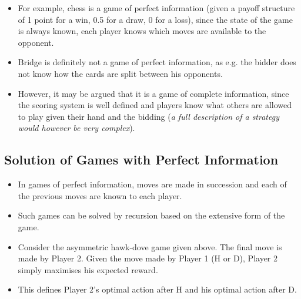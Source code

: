 \documentclass[]{report}
\begin{document}
\begin{itemize}
	\item For example, chess is a game of perfect information (given a payoff
	structure of 1 point for a win, 0.5 for a draw, 0 for a loss), since
	the state of the game is always known, each player knows which
	moves are available to the opponent.
\item Bridge is definitely not a game of perfect information, as e.g. the
	bidder does not know how the cards are split between his
	opponents. 
	\item However, it may be argued that it is a game of
	complete information, since the scoring system is well defined and
	players know what others are allowed to play given their hand and
	the bidding (\textit{a full description of a strategy would however be very
	complex}).
\end{itemize}


\subsection{Solution of Games with Perfect Information}
\begin{itemize}
\item In games of perfect information, moves are made in succession and
each of the previous moves are known to each player.
\item Such games can be solved by recursion based on the extensive
form of the game.
\item Consider the asymmetric hawk-dove game given above. The final
move is made by Player 2. Given the move made by Player 1 (H or
D), Player 2 simply maximises his expected reward.
\item This defines Player 2’s optimal action after H and his optimal
action after D.
\end{itemize}
\end{document}
